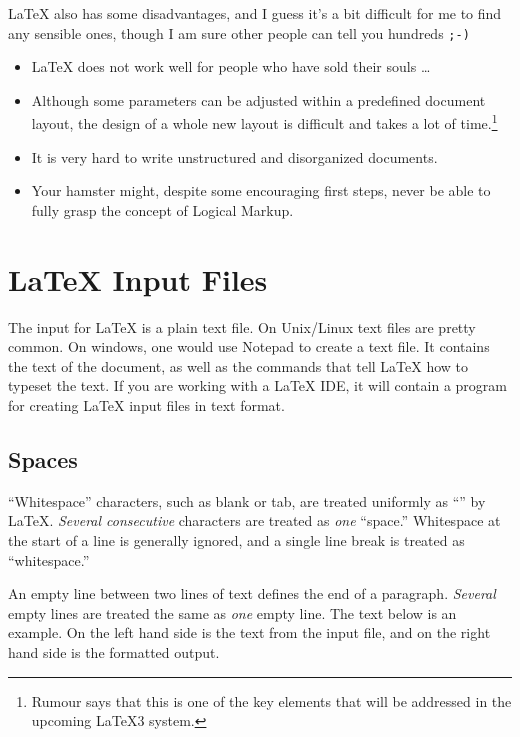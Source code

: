 \medskip

\noindent\LaTeX{} also has some disadvantages, and I guess it's a bit
difficult for me to find any sensible ones, though I am sure other people
can tell you hundreds \texttt{;-)}

\begin{itemize}
\item \LaTeX{} does not work well for people who have sold their
  souls \ldots
\item Although some parameters can be adjusted within a predefined
  document layout, the design of a whole new layout is difficult and
  takes a lot of time.\footnote{Rumour says that this is one of the
    key elements that will be addressed in the upcoming \LaTeX 3
    system.}
\item It is very hard to write unstructured and disorganized documents.
\item Your hamster might, despite some encouraging first steps, never be
able to fully grasp the concept of Logical Markup.
\end{itemize}

\section{\LaTeX{} Input Files}

The input for \LaTeX{} is a plain text file. On Unix/Linux text files are
pretty common. On windows, one would use Notepad to create a text file. It
contains the text of the document, as well as the commands that tell
\LaTeX{} how to typeset the text. If you are working with a \LaTeX{} IDE, it will contain a program for creating
\LaTeX{} input files in text format.

\subsection{Spaces}

``Whitespace'' characters, such as blank or tab, are
treated uniformly as ``'' by \LaTeX{}. \emph{Several
  consecutive}  characters are treated as \emph{one}
``space.''  Whitespace at the start of a line is generally ignored, and
a single line break is treated as ``whitespace.''

An empty line between two lines of text defines the end of a
paragraph. \emph{Several} empty lines are treated the same as
\emph{one} empty line. The text below is an example. On the left hand
side is the text from the input file, and on the right hand side is the
formatted output.

